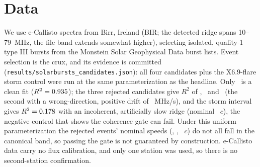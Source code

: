 \documentclass[twocolumn]{aastex631}
\newcommand{\code}[1]{\texttt{#1}}
\begin{document}
\section{Data}
We use e-Callisto spectra from Birr, Ireland (BIR; the detected ridge spans 10--79~MHz,
the file band extends somewhat higher), selecting
isolated, quality-1 type III bursts from the Monstein Solar Geophysical Data burst lists. Event
selection is the crux, and its evidence is committed
(\code{results/solarbursts\_candidates.json}): all four candidates plus the X6.9-flare storm
control were run at the same parameterization as the headline. Only \sbSource\ is a clean fit
($R^2=0.935$); the three rejected candidates give $R^2$ of \sbCandOneRsq, \sbCandTwoRsq\ and
\sbCandThreeRsq\ (the second with a wrong-direction, positive drift of
\sbCandTwoDrift~MHz/s), and the storm interval gives $R^2=0.178$ with an incoherent,
artificially slow ridge (nominal \sbCandStormSpeedC~$c$), the negative control that shows the coherence gate can fail. Under this uniform parameterization the rejected events' nominal speeds
(\sbCandOneSpeedC, \sbCandTwoSpeedC, \sbCandThreeSpeedC~$c$) do not all fall in the canonical
band, so passing the gate is not guaranteed by construction. e-Callisto data carry no flux
calibration, and only one station was used, so there is no second-station confirmation.
\end{document}
